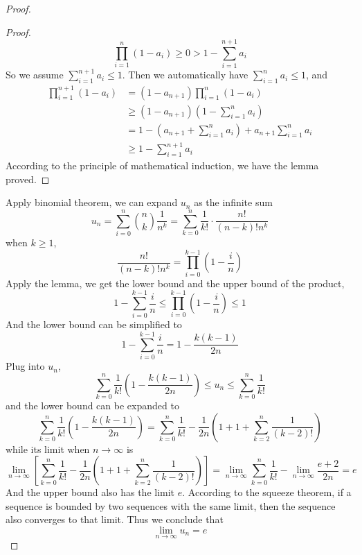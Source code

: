 \begin{enumerate}
\begin{proof}
\begin{proof}
    \[ \prod_{i=1}^{n}(1-a_i)\geq 0 > 1- \sum_{i=1}^{n+1}a_i \]
    So we assume \(\sum_{i=1}^{n+1}a_i\leq1\).
    Then we automatically have \(\sum_{i=1}^{n}a_i\leq1\), and
    \begin{align*}
    	\prod_{i=1}^{n+1}(1-a_i)&=(1-a_{n+1})\prod_{i=1}^{n}(1-a_i)\\
        &\geq (1-a_{n+1})\left(1-\sum_{i=1}^n a_i \right)\\
        &= 1-\left(a_{n+1}+\sum_{i=1}^{n}a_i \right)+a_{n+1}\sum_{i=1}^n a_i\\
        &\geq 1-\sum_{i=1}^{n+1}a_i
    \end{align*}
    According to the principle of mathematical induction, we have the lemma proved.
    \end{proof}
    Apply binomial theorem, we can expand $u_n$ as the infinite sum
    \[ u_n=\sum_{i=0}^n \binom{n}{k} \frac{1}{n^k}=\sum_{k=0}^{n}\frac{1}{k!}\cdot\frac{n!}{(n-k)!n^k} \]
    when \(k\geq1\),
    \[ \frac{n!}{(n-k)!n^k}=\prod_{i=0}^{k-1}\left(1-\frac{i}{n}\right) \]
    Apply the lemma, we get the lower bound and the upper bound of the product,
    \[ 1-\sum_{i=0}^{k-1}\frac{i}{n}\leq\prod_{i=0}^{k-1}\left(1-\frac{i}{n}\right)\leq1 \]
    And the lower bound can be simplified to
    \[ 1-\sum_{i=0}^{k-1}\frac{i}{n}=1-\frac{k(k-1)}{2n} \]
    Plug into $u_n$,
    \[ \sum_{k=0}^n \frac{1}{k!}\left(1-\frac{k(k-1)}{2n}\right)\leq u_n\leq\sum_{k=0}^{n}\frac{1}{k!} \]
    and the lower bound can be expanded to
    \[ \sum_{k=0}^n \frac{1}{k!}\left(1-\frac{k(k-1)}{2n}\right)= \sum_{k=0}^{n}\frac{1}{k!}-\frac{1}{2n}\left(1+1+\sum_{k=2}^n \frac{1}{(k-2)!}\right) \]
    while its limit when \(n\to\infty\) is
    \[ \lim_{n\to\infty}\left[\sum_{k=0}^{n}\frac{1}{k!}-\frac{1}{2n}\left(1+1+\sum_{k=2}^n \frac{1}{(k-2)!}\right)\right]=\lim_{n\to\infty}\sum_{k=0}^n\frac{1}{k!}-\lim_{n\to\infty}\frac{e+2}{2n}=e \]
    And the upper bound also has the limit $e$.
    According to the squeeze theorem, if a sequence is bounded by two sequences with the same limit, then the sequence also converges to that limit.
    Thus we conclude that 
    \[ \lim_{n\to\infty}u_n=e \]
    \end{proof}
\end{enumerate}